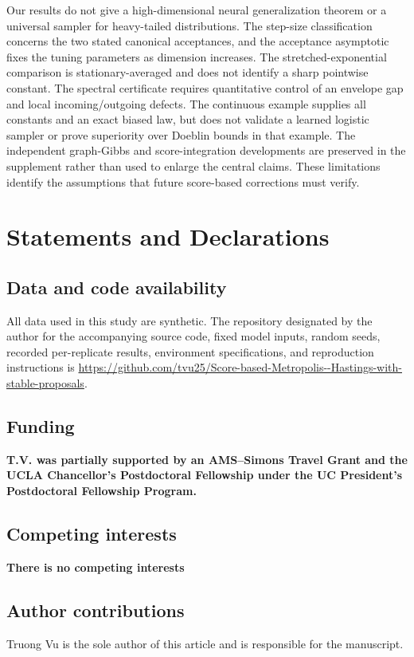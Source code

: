 \documentclass[pdflatex,iicol,sn-mathphys-ay]{sn-jnl}
\theoremstyle{definition}\newtheorem{definition}[theorem]{Definition}
\theoremstyle{remark}\newtheorem{remark}[theorem]{Remark}
\numberwithin{equation}{section}
\newcommand{\1}{\mathbf 1}
\begin{document}
Our results do not give a high-dimensional neural generalization theorem or a universal sampler for heavy-tailed distributions. The step-size classification concerns the two stated canonical acceptances, and the acceptance asymptotic fixes the tuning parameters as dimension increases. The stretched-exponential comparison is stationary-averaged and does not identify a sharp pointwise constant. The spectral certificate requires quantitative control of an envelope gap and local incoming/outgoing defects. The continuous example supplies all constants and an exact biased law, but does not validate a learned logistic sampler or prove superiority over Doeblin bounds in that example. The independent graph-Gibbs and score-integration developments are preserved in the supplement rather than used to enlarge the central claims. These limitations identify the assumptions that future score-based corrections must verify.

\section*{Statements and Declarations}
\subsection*{Data and code availability}
All data used in this study are synthetic. The repository designated by the author for the accompanying source code, fixed model inputs, random seeds, recorded per-replicate results, environment specifications, and reproduction instructions is
{\def\UrlBreaks{\do\/\do-\do.}\url{https://github.com/tvu25/Score-based-Metropolis--Hastings-with-stable-proposals}}.


\subsection*{Funding}
\textbf{T.V. was partially supported by an AMS--Simons Travel Grant and the UCLA Chancellor's Postdoctoral Fellowship under the UC President's Postdoctoral Fellowship Program.}

\subsection*{Competing interests}
\textbf{There is no competing interests}

\subsection*{Author contributions}
Truong Vu is the sole author of this article and is responsible for the manuscript. 
\end{document}
